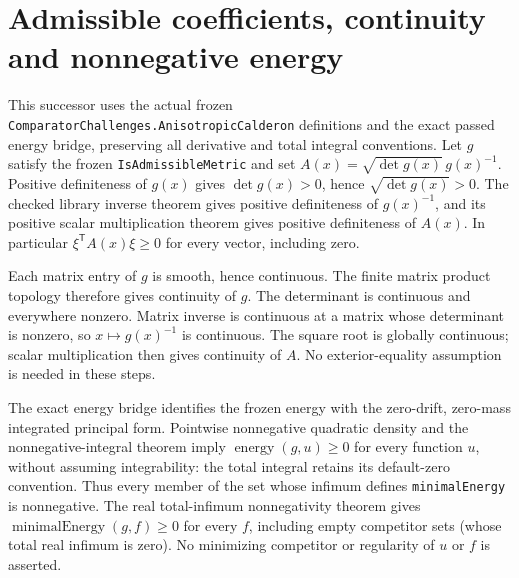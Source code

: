 \documentclass[11pt]{article}
\theoremstyle{definition}
\theoremstyle{remark}
\numberwithin{equation}{section}
\begin{document}
\section{Admissible coefficients, continuity and nonnegative energy}\label{metric-coefficient:positivity}\label{metric-coefficient:continuity}\label{metric-coefficient:energy}
This successor uses the actual frozen
\texttt{ComparatorChallenges.AnisotropicCalderon} definitions and the exact
passed energy bridge, preserving all derivative and total integral conventions.
Let $g$ satisfy the frozen \texttt{IsAdmissibleMetric} and set
$A(x)=\sqrt{\det g(x)}\,g(x)^{-1}$. Positive definiteness of $g(x)$ gives
$\det g(x)>0$, hence $\sqrt{\det g(x)}>0$. The checked library inverse theorem
gives positive definiteness of $g(x)^{-1}$, and its positive scalar
multiplication theorem gives positive definiteness of $A(x)$.
In particular $\xi^\mathsf T A(x)\xi\ge0$ for every vector, including zero.

Each matrix entry of $g$ is smooth, hence continuous. The finite matrix
product topology therefore gives continuity of $g$. The determinant is
continuous and everywhere nonzero. Matrix inverse is continuous at a matrix
whose determinant is nonzero, so $x\mapsto g(x)^{-1}$ is continuous. The square
root is globally continuous; scalar multiplication then gives continuity of
$A$. No exterior-equality assumption is needed in these steps.

The exact energy bridge identifies the frozen energy with the zero-drift,
zero-mass integrated principal form. Pointwise nonnegative quadratic density
and the nonnegative-integral theorem imply $\operatorname{energy}(g,u)\ge0$
for every function $u$, without assuming integrability: the total integral
retains its default-zero convention. Thus every member of the set whose
infimum defines \texttt{minimalEnergy} is nonnegative. The real total-infimum
nonnegativity theorem gives $\operatorname{minimalEnergy}(g,f)\ge0$ for every
$f$, including empty competitor sets (whose total real infimum is zero).
No minimizing competitor or regularity of $u$ or $f$ is asserted.
\end{document}
